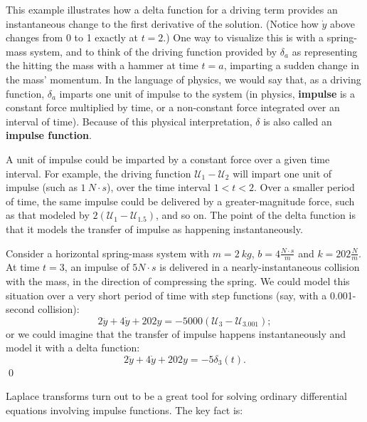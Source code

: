 {{{This example illustrates how a delta function for a driving term provides an instantaneous change to the first derivative of the solution.  (Notice how $\dot{y}$ above changes from 0 to 1 exactly at $t=2$.)  One way to visualize this is with a spring-mass system, and to think of the driving function provided by $\delta_a$ as representing the hitting the mass with a hammer at time $t=a$, imparting a sudden change in the mass' momentum.  In the language of physics, we would say that, as a driving function, $\delta_a$ imparts one unit of impulse to the system (in physics, 
	{\bf impulse} is a constant force multiplied by time, or a non-constant force integrated over an interval of time).  Because of this physical interpretation, $\delta$ is also called an 
	{\bf impulse function}.

A unit of impulse could be imparted by a constant force over a given time interval.  For example, the driving function $\mathcal{U}_1 - \mathcal{U}_2$ will impart one unit of impulse (such as $1 \ N\cdot s$), over the time interval $1 <t < 2$.  Over a smaller period of time, the same impulse could be delivered by a greater-magnitude force, such as that modeled by $2 \left( \mathcal{U}_1 - \mathcal{U}_{1.5} \right)$, and so on.  The point of the delta function is that it models the transfer of impulse as happening instantaneously.


\example Consider a horizontal spring-mass system with $m=2 \ kg$, $b=4 \frac{N\cdot s}{m}$ and $k=202 \frac{N}{m}$.  At time $t=3$, an impulse of $5 N \cdot s$ is delivered in a nearly-instantaneous collision with the mass, in the direction of compressing the spring.  We could model this situation over a very short period of time with step functions (say, with a 0.001-second collision):
\[ 2 \ddot{y} + 4 \dot{y} + 202y = -5000 \left( \mathcal{U}_3 - \mathcal{U}_{3.001} \right);\]
or we could imagine that the transfer of impulse happens instantaneously and model it with a delta function:
\[ 2 \ddot{y} + 4 \dot{y} + 202y = -5 \delta_3(t).\]
\qed

Laplace transforms turn out to be a great tool for solving ordinary differential equations involving impulse functions.  The key fact is:
{\begin{center}
\end{center}



}}}}
